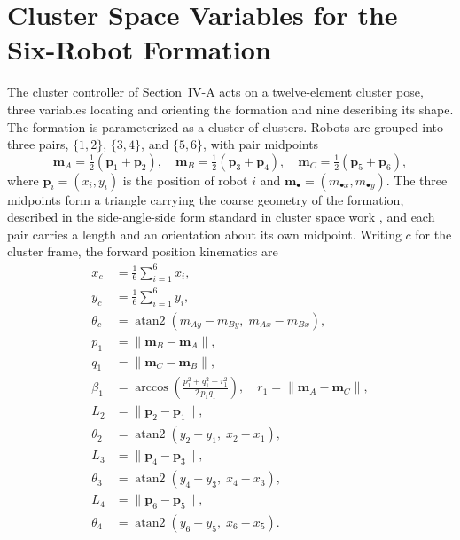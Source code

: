 \documentclass[lettersize,journal]{IEEEtran}
\begin{document}
\appendices

\section{Cluster Space Variables for the Six-Robot Formation}
\label{app:cluster_vars}

The cluster controller of Section~\mbox{IV-A} acts on a twelve-element
cluster pose, three variables locating and orienting the formation and
nine describing its shape. The formation is parameterized as a cluster
of clusters. Robots are grouped into three pairs, $\{1,2\}$, $\{3,4\}$,
and $\{5,6\}$, with pair midpoints
\begin{equation}
    \mathbf{m}_A = \tfrac{1}{2}(\mathbf{p}_1 + \mathbf{p}_2), \quad
    \mathbf{m}_B = \tfrac{1}{2}(\mathbf{p}_3 + \mathbf{p}_4), \quad
    \mathbf{m}_C = \tfrac{1}{2}(\mathbf{p}_5 + \mathbf{p}_6),
    \label{eq:pair_midpoints}
\end{equation}
where $\mathbf{p}_i = (x_i, y_i)$ is the position of robot $i$ and
$\mathbf{m}_\bullet = (m_{\bullet x}, m_{\bullet y})$. The three
midpoints form a triangle carrying the coarse geometry of the
formation, described in the side-angle-side form standard in cluster
space work \cite{37,38}, and each pair carries a length and an
orientation about its own midpoint. Writing $c$ for the cluster frame,
the forward position kinematics are
\begin{align}
    x_c &= \frac{1}{6}\sum_{i=1}^{6} x_i,
    \label{eq:ck_xc}\\
    y_c &= \frac{1}{6}\sum_{i=1}^{6} y_i,
    \label{eq:ck_yc}\\
    \theta_c &= \operatorname{atan2}
    \left(m_{Ay} - m_{By},\; m_{Ax} - m_{Bx}\right),
    \label{eq:ck_thetac}\\
    p_1 &= \lVert \mathbf{m}_B - \mathbf{m}_A \rVert,
    \label{eq:ck_p}\\
    q_1 &= \lVert \mathbf{m}_C - \mathbf{m}_B \rVert,
    \label{eq:ck_q}\\
    \beta_1 &= \arccos\!\left(
    \frac{p_1^2 + q_1^2 - r_1^2}{2\,p_1 q_1}\right),
    \quad r_1 = \lVert \mathbf{m}_A - \mathbf{m}_C \rVert,
    \label{eq:ck_beta}\\
    L_2 &= \lVert \mathbf{p}_2 - \mathbf{p}_1 \rVert,
    \label{eq:ck_L2}\\
    \theta_2 &= \operatorname{atan2}(y_2 - y_1,\; x_2 - x_1),
    \label{eq:ck_th2}\\
    L_3 &= \lVert \mathbf{p}_4 - \mathbf{p}_3 \rVert,
    \label{eq:ck_L3}\\
    \theta_3 &= \operatorname{atan2}(y_4 - y_3,\; x_4 - x_3),
    \label{eq:ck_th3}\\
    L_4 &= \lVert \mathbf{p}_6 - \mathbf{p}_5 \rVert,
    \label{eq:ck_L4}\\
    \theta_4 &= \operatorname{atan2}(y_6 - y_5,\; x_6 - x_5).
    \label{eq:ck_th4}
\end{align}
\end{document}
